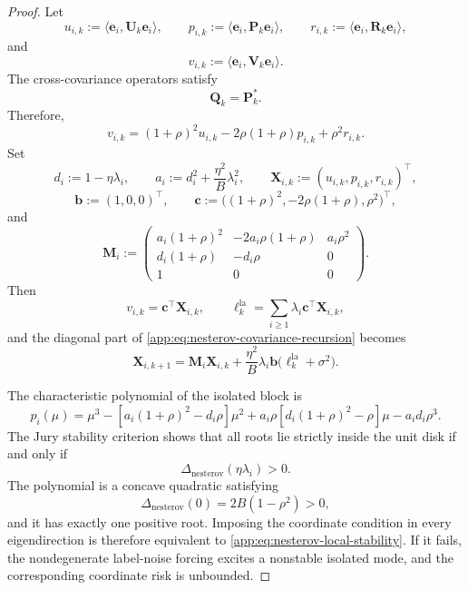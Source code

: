 \documentclass[10pt,a4paper]{amsart}
\newcommand{\bM}{\fbf{M}}
\newcommand{\bP}{\fbf{P}}
\newcommand{\bQ}{\fbf{Q}}
\newcommand{\bR}{\fbf{R}}
\newcommand{\bU}{\fbf{U}}
\newcommand{\bV}{\fbf{V}}
\newcommand{\bX}{\fbf{X}}
\newcommand{\bb}{\fbf{b}}
\newcommand{\bc}{\fbf{c}}
\newcommand{\fbf}[1]{\mathbf{#1}}
\renewcommand{\geq}{\geqslant}
\newcommand{\la}{\mathrm{la}}
\newcommand{\nesterov}{\mathrm{nesterov}}
\begin{document}
\begin{proof}
Let
\[
u_{i,k}:=\langle\mathbf e_i,\bU_k\mathbf e_i\rangle,
\qquad
p_{i,k}:=\langle\mathbf e_i,\bP_k\mathbf e_i\rangle,
\qquad
r_{i,k}:=\langle\mathbf e_i,\bR_k\mathbf e_i\rangle,
\]
and
\[
v_{i,k}:=\langle\mathbf e_i,\bV_k\mathbf e_i\rangle.
\]
The cross-covariance operators satisfy
\[
\bQ_k=\bP_k^*.
\]
Therefore,
\[
v_{i,k}
=
(1+\rho)^2u_{i,k}
-
2\rho(1+\rho)p_{i,k}
+
\rho^2r_{i,k}.
\]
Set
\[
d_i:=1-\eta\lambda_i,
\qquad
a_i:=d_i^2+\frac{\eta^2}{B}\lambda_i^2,
\qquad
\bX_{i,k}:=(u_{i,k},p_{i,k},r_{i,k})^\top,
\]
\[
\bb:=(1,0,0)^\top,
\qquad
\bc:=\bigl((1+\rho)^2,-2\rho(1+\rho),\rho^2\bigr)^\top,
\]
and
\[
\bM_i
:=
\begin{pmatrix}
a_i(1+\rho)^2
&
-2a_i\rho(1+\rho)
&
a_i\rho^2
\\
d_i(1+\rho)
&
-d_i\rho
&
0
\\
1
&
0
&
0
\end{pmatrix}.
\]
Then
\[
v_{i,k}=\bc^\top\bX_{i,k},
\qquad
\ell_k^{\la}=\sum_{i\geq1}\lambda_i\bc^\top\bX_{i,k},
\]
and the diagonal part of \eqref{app:eq:nesterov-covariance-recursion} becomes
\begin{equation}
\label{app:eq:nesterov-block-recursion}
\bX_{i,k+1}
=
\bM_i\bX_{i,k}
+
\frac{\eta^2}{B}\lambda_i\bb\bigl(\ell_k^{\la}+\sigma^2\bigr).
\end{equation}

The characteristic polynomial of the isolated block is
\[
p_i(\mu)
=
\mu^3
-
\left[a_i(1+\rho)^2-d_i\rho\right]\mu^2
+
a_i\rho\left[d_i(1+\rho)^2-\rho\right]\mu
-
a_id_i\rho^3.
\]
The Jury stability criterion shows that all roots lie strictly inside the unit disk if and only if
\[
\Delta_{\nesterov}(\eta\lambda_i)>0.
\]
The polynomial is a concave quadratic satisfying
\[
\Delta_{\nesterov}(0)=2B(1-\rho^2)>0,
\]
and it has exactly one positive root. Imposing the coordinate condition in every eigendirection is
therefore equivalent to \eqref{app:eq:nesterov-local-stability}. If it fails,
the nondegenerate label-noise forcing excites a nonstable isolated mode, and the corresponding
coordinate risk is unbounded.


\end{proof}
\end{document}
